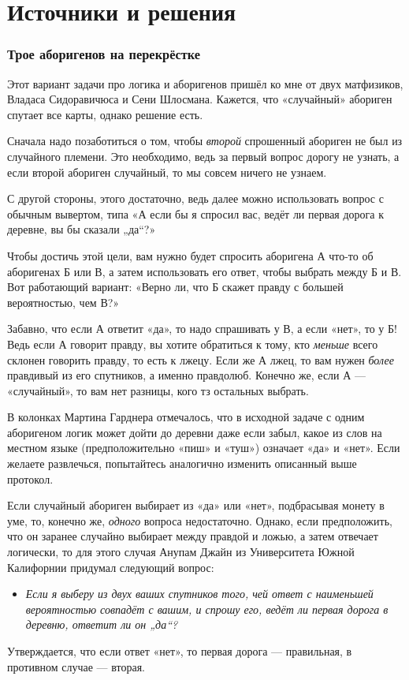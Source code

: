 \section*{Источники и решения}

\subsubsection*{Трое аборигенов на перекрёстке}

Этот вариант задачи про логика и аборигенов пришёл ко мне от двух матфизиков, Владаса Сидоравичюса и Сени Шлосмана.
Кажется, что «случайный» абориген спутает все карты, однако решение есть.

Сначала надо позаботиться о том, чтобы \emph{второй} спрошенный абориген не был из случайного племени.
Это необходимо, ведь за первый вопрос дорогу не узнать, а если второй абориген случайный, то мы совсем ничего не узнаем.

С другой стороны, этого достаточно, ведь далее можно использовать вопрос с обычным вывертом, типа «А если бы я спросил вас, ведёт ли первая дорога к деревне, вы бы сказали „да“?»

Чтобы достичь этой цели, вам нужно будет спросить аборигена А что-то об аборигенах Б или В, а затем использовать его ответ, чтобы выбрать между Б и В.
Вот работающий вариант: «Верно ли, что Б скажет правду с большей вероятностью, чем В?»

Забавно, что если А ответит «да», то надо спрашивать у В, а если «нет», то у Б!
Ведь если А говорит правду, вы хотите обратиться к тому, кто \emph{меньше} всего склонен говорить правду, то есть к лжецу.
Если же А лжец, то вам нужен \emph{более} правдивый из его спутников, а именно правдолюб.
Конечно же, если А --- «случайный», то вам нет разницы, кого тз остальных выбрать.

В колонках Мартина Гарднера отмечалось, что в исходной задаче с одним аборигеном логик может дойти до деревни даже если забыл, какое из слов на местном языке (предположительно «пиш» и «туш») означает «да» и «нет».
Если желаете развлечься, попытайтесь аналогично изменить описанный выше протокол.

Если случайный абориген выбирает из «да» или «нет», подбрасывая монету в уме, то, конечно же, \emph{одного} вопроса недостаточно.
Однако, если предположить, что он заранее случайно выбирает между правдой и ложью, а затем отвечает логически,
то для этого случая Анупам Джайн из Университета Южной Калифорнии придумал следующий вопрос:
\begin{itemize}
 \item[] \emph{Если я выберу из двух ваших спутников того, чей ответ с наименьшей вероятностью совпадёт с вашим, и спрошу его, ведёт ли первая дорога в деревню, ответит ли он „да“?}
\end{itemize}
Утверждается, что если ответ «нет», то первая дорога --- правильная, в противном случае --- вторая.

